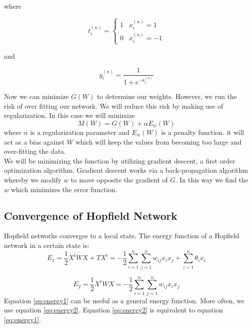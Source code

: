 where

\begin{equation}
\label{eq:opt2}
t_{i}^{(n)} = \begin{cases}
          1 & x_{i}^{(n)} = 1\\
          0 & x_{i}^{(n)} = -1
        \end{cases}
\end{equation}

and

\begin{equation}
\label{eq:opt3}
y_{i}^{(n)} = \frac{1}{1 + e^{-a_{i}^{(n)}}}
\end{equation}

Now we can minimize $G(W)$ to determine our weights. However, we run the risk of over fitting our network. We will reduce this risk by making use of regularization. In this case we will minimize 
\begin{equation}
\label{eq:opt4}
M(W) = G(W) + \alpha E_w(W)
\end{equation}
where $\alpha$ is a regularization parameter and $E_w(W)$ is a penalty function. it will act as a bias against $W$ which will keep the values from becoming too large and over-fitting the data.\\

We will be minimizing the function by utilizing gradient descent, a first order optimization algorithm. Gradient descent works via a back-propagation algorithm whereby we modify $w$ to move opposite the gradient of $G$. In this way we find the $w$ which minimizes the error function.


\subsection{Convergence of Hopfield Network}
Hopfield networks converges to a local state. The energy function of a Hopfield network in a certain state is:
\begin{equation}
\label{eq:energy1}
E_1 = \frac{1}{2}X^tWX + TX^t = - \frac{1}{2}\sum_{i = 1}^{n}\sum_{j = 1}^{n}w_{ij} x_i x_j + \sum_{i = 1}^n \theta_i x_i
\end{equation}

\begin{equation}
\label{eq:energy2}
E_2 = \frac{1}{2}X^tWX = - \frac{1}{2}\sum_{i = 1}^{n}\sum_{j = 1}^{n}w_{ij} x_i x_j
\end{equation}
Equation \ref{eq:energy1} can be useful as a general energy function. More often, we use equation \ref{eq:energy2}. Equation \ref{eq:energy2} is equivalent to equation \ref{eq:energy1}.\\

